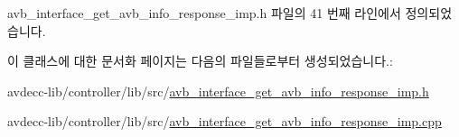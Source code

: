 avb\+\_\+interface\+\_\+get\+\_\+avb\+\_\+info\+\_\+response\+\_\+imp.\+h 파일의 41 번째 라인에서 정의되었습니다.



이 클래스에 대한 문서화 페이지는 다음의 파일들로부터 생성되었습니다.\+:\begin{DoxyCompactItemize}
\item 
avdecc-\/lib/controller/lib/src/\hyperlink{avb__interface__get__avb__info__response__imp_8h}{avb\+\_\+interface\+\_\+get\+\_\+avb\+\_\+info\+\_\+response\+\_\+imp.\+h}\item 
avdecc-\/lib/controller/lib/src/\hyperlink{avb__interface__get__avb__info__response__imp_8cpp}{avb\+\_\+interface\+\_\+get\+\_\+avb\+\_\+info\+\_\+response\+\_\+imp.\+cpp}\end{DoxyCompactItemize}
